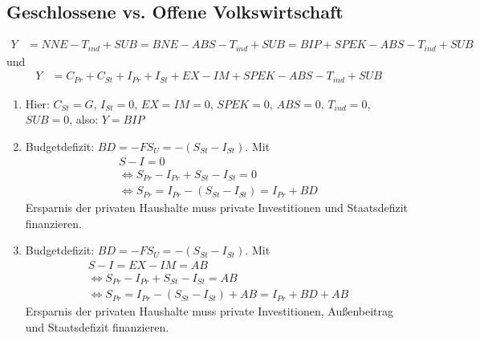 \documentclass{scrartcl}
\begin{document}
\subsection{Geschlossene vs. Offene Volkswirtschaft}
\begin{align*}
  Y &= NNE - T_{ind} + SUB = BNE-ABS-T_{ind}+SUB = BIP + SPEK - ABS - T_{ind} + SUB
\end{align*}
und
\begin{align*}
  Y &=C_{Pr}+C_{St} + I_{Pr}+I_{St} + EX - IM + SPEK - ABS - T_{ind} + SUB
\end{align*}
  \begin{enumerate}
    \item Hier: $C_{St}= G$, $I_{St}=0$, $EX=IM=0$, $SPEK=0$, $ABS=0$, $T_{ind}=0$, $SUB=0$, also: $Y=BIP$
    \item Budgetdefizit: $BD=-FS_U=-(S_{St}-I_{St})$. Mit
    \begin{align*}
      S-I=0\\
      \Leftrightarrow S_{Pr}-I_{Pr} + S_{St}-I_{St} = 0\\
      \Leftrightarrow S_{Pr} = I_{Pr} - (S_{St}-I_{St}) = I_{Pr}+BD
    \end{align*}
    Ersparnis der privaten Haushalte muss private Investitionen und Staatsdefizit finanzieren.
    \item Budgetdefizit: $BD=-FS_U=-(S_{St}-I_{St})$. Mit
    \begin{align*}
      S-I=EX-IM=AB\\
      \Leftrightarrow S_{Pr}-I_{Pr} + S_{St}-I_{St} = AB\\
      \Leftrightarrow S_{Pr} = I_{Pr} - (S_{St}-I_{St}) + AB = I_{Pr}+BD+AB
    \end{align*}
    Ersparnis der privaten Haushalte muss private Investitionen, Au{\ss}enbeitrag und Staatsdefizit finanzieren.
  \end{enumerate}
\end{document}
